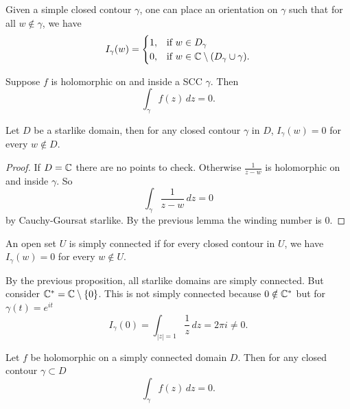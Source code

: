 \documentclass[10pt, a4paper]{article}
\begin{document}
\begin{proposition}
    Given a simple closed contour $\gamma$,
    one can place an orientation on $\gamma$ such that for all $w \notin \gamma$,
    we have
    \[
    I_{\gamma}(w) = \begin{cases}
        1, &\text{if $w \in D_{\gamma}$} \\
        0, &\text{if $w \in \mathbb{C} \setminus (D_{\gamma} \cup \gamma)$}.
    \end{cases}
    \]
\end{proposition}

\begin{theorem}
    Suppose $f$ is holomorphic on and inside a SCC $\gamma$.
    Then
    \[
    \int_{\gamma}f(z)\,dz = 0.
    \]
\end{theorem}

\begin{proposition}
    Let $D$ be a starlike domain,
    then for any closed contour $\gamma$ in $D$,
    $I_{\gamma}(w) = 0$ for every $w \notin D$.

    \begin{proof}
        If $D = \mathbb{C}$ there are no points to check.
        Otherwise $\frac{1}{z - w}$ is holomorphic on and inside $\gamma$.
        So
        \[
        \int_{\gamma}\frac{1}{z - w}\,dz = 0
        \]
        by Cauchy-Goursat starlike.
        By the previous lemma the winding number is $0$.
    \end{proof}
\end{proposition}

\begin{definition}
    An open set $U$ is simply connected if for every closed contour in $U$,
    we have $I_{\gamma}(w) = 0$ for every $w \notin U$.
\end{definition}

\begin{example}
    By the previous proposition,
    all starlike domains are simply connected.
    But consider $\mathbb{C} ^ {*} = \mathbb{C} \setminus \{0\}$.
    This is not simply connected because $0 \notin \mathbb{C} ^ {*}$ but for $\gamma(t) = e ^ {it}$
    \[
    I_{\gamma}(0) = \int_{|z| = 1}\frac{1}{z}\,dz = 2\pi i \neq 0.
    \]
\end{example}

\begin{theorem}
    Let $f$ be holomorphic on a simply connected domain $D$.
    Then for any closed contour $\gamma \subset D$
    \[
    \int_{\gamma}f(z)\,dz = 0.
    \]
\end{theorem}
\end{document}
